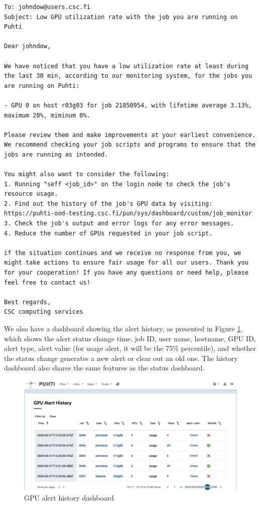 \begin{verbatim}
To: johndow@users.csc.fi
Subject: Low GPU utilization rate with the job you are running on Puhti

Dear johndow,

We have noticed that you have a low utilization rate at least during the last 30 min, according to our monitoring system, for the jobs you are running on Puhti:

- GPU 0 on host r03g03 for job 21850954, with lifetime average 3.13%, maximum 20%, miminum 0%.

Please review them and make improvements at your earliest convenience. We recommend checking your job scripts and programs to ensure that the jobs are running as intended.

You might also want to consider the following:
1. Running "seff <job_id>" on the login node to check the job's resource usage.
2. Find out the history of the job's GPU data by visiting: https://puhti-ood-testing.csc.fi/pun/sys/dashboard/custom/job_monitor
3. Check the job's output and error logs for any error messages.
4. Reduce the number of GPUs requested in your job script.

if the situation continues and we receive no response from you, we might take actions to ensure fair usage for all our users. Thank you for your cooperation! If you have any questions or need help, please feel free to contact us!

Best regards,
CSC computing services
\end{verbatim}

We also have a dashboard showing the alert history, as presented in Figure \ref{fig_history_dashboard}, which shows the alert status change time, job ID, user name, hostname, GPU ID, alert type, alert value (for usage alert, it will be the 75\% percentile), and whether the status change generates a new alert or clear out an old one. The history dashboard also shares the same features as the status dashboard.

\begin{figure}[H]
    \centering
    \includegraphics[width=1.1\textwidth]{figures/history-dashboard.png}
    \caption{GPU alert history dashboard}
    \label{fig_history_dashboard}
\end{figure}
